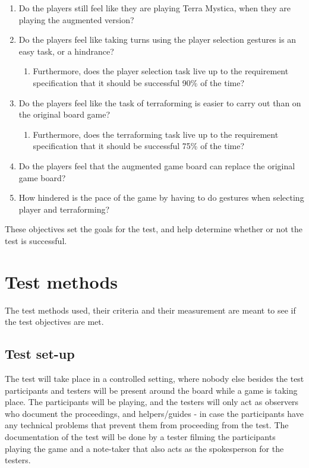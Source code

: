 \begin{enumerate}
\item Do the players still feel like they are playing Terra Mystica, when they are playing the augmented version?
\item Do the players feel like taking turns using the player selection gestures is an easy task, or a hindrance?
\begin{enumerate}
\item Furthermore, does the player selection task live up to the requirement specification that it should be successful 90\% of the time?
\end{enumerate}
\item Do the players feel like the task of terraforming is easier to carry out than on the original board game?
\begin{enumerate}
\item Furthermore, does the terraforming task live up to the requirement specification that it should be successful 75\% of the time?
\end{enumerate}
\item Do the players feel that the augmented game board can replace the original game board?
\item How hindered is the pace of the game by having to do gestures when selecting player and terraforming?
\end{enumerate}

These objectives set the goals for the test, and help determine whether or not the test is successful. 

\section{Test methods}
The test methods used, their criteria and their measurement are meant to see if the test objectives are met.

\subsection{Test set-up}
The test will take place in a controlled setting, where nobody else besides the test participants and testers will be present around the board while a game is taking place. The participants will be playing, and the testers will only act as observers who document the proceedings, and helpers/guides - in case the participants have any technical problems that prevent them from proceeding from the test.
The documentation of the test will be done by a tester filming the participants playing the game and a note-taker that also acts as the spokesperson for the testers.

